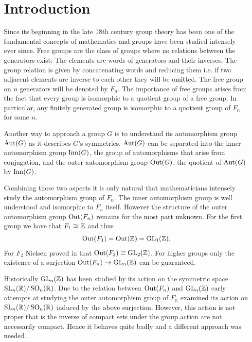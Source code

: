 %

\usepackage{./tikzit/tikzit}
\usepackage[
	sortcites=true,
	maxnames=6,
	minnames=6
]{biblatex}


\usepackage[stable]{footmisc}
\usepackage{caption}
\usepackage{subcaption}
\usepackage{listings}
\usepackage{thmtools,thm-restate}
\lstset{
	breakatwhitespace=True,
	breaklines=True,
	tabsize=2,
	extendedchars=True,
	keepspaces=True
}

	

\newpage
\section{Introduction}
Since its beginning in the late 18th century group theory has been one of the fundamental concepts of mathematics and groups have been studied intensely ever since.
Free groups are the class of groups where no relations between the generators exist: 
The elements are words of generators and their inverses. The group relation is given by concatenating words
and reducing them i.e. if two adjacent elements are inverse to each other they will be omitted.
The free group on $n$ generators will be denoted by $F_{n}$.
The importance of free groups arises from the fact that every group is isomorphic to a quotient group of a free group.
In particular, any finitely generated group is isomorphic to a quotient group of $F_{n}$ for some $n$.

Another way to approach a group $G$ is to understand its automorphism group $\operatorname{Aut}(G)$ as it describes $G$'s symmetries.
$\operatorname{Aut}(G)$ can be separated into the inner automorphism group $\operatorname{Inn}(G)$,
the group of automorphisms that arise from conjugation, and the outer automorphism group $\operatorname{Out}(G)$, the quotient of  $\operatorname{Aut}(G)$ by $\operatorname{Inn}(G)$.

Combining those two aspects it is only natural that mathematicians intensely study the automorphism group of $F_{n}$.
The inner automorphism group is well understood and isomorphic to $F_{n}$ itself.
However the structure of the outer automorphism group $\operatorname{Out}(F_{n})$ remains for the most part unknown.
For the first group we have that $F_{1} \cong \mathbb{Z}$ and thus
\[
	\operatorname{Out}(F_1) = \operatorname{Out}(\mathbb{Z}) = \operatorname{GL}_{1}(\mathbb{Z})
.\] 
For $F_{2}$ Nielsen proved in \cite{nielsen17} that $\operatorname{Out}(F_2) \cong \operatorname{GL}_{2}(\mathbb{Z})$.
For higher groups only the existence of a surjection $\operatorname{Out}(F_{n}) \to \operatorname{GL}_{n}(\mathbb{Z})$ can be guaranteed.

Historically $\operatorname{GL}_{n}(\mathbb{Z})$ has been studied by its action on the symmetric space $\operatorname{SL}_{n}(\mathbb{R}) / \operatorname{SO}_{n}(\mathbb{R})$.
Due to the relation between $\operatorname{Out}(F_{n})$ and $\operatorname{GL}_{n}(\mathbb{Z})$ early attempts at studying the outer automorphism group of $F_{n}$
examined its action on $\operatorname{SL}_{n}(\mathbb{R}) / \operatorname{SO}_{n}(\mathbb{R})$ induced by the above surjection.
However, this action is not proper that is the inverse of compact sets under the group action are not necessarily compact.
Hence it behaves quite badly and a different approach was needed.

